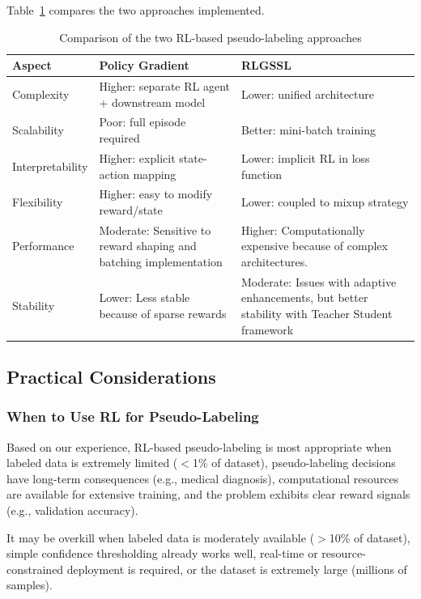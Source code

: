 \documentclass{scrartcl}
\begin{document}
Table~\ref{tab:approach_comparison} compares the two approaches implemented.

\begin{table}[H]
    \centering
    \begin{tabular}{p{3cm}p{5cm}p{5cm}}
        \hline
        \textbf{Aspect} & \textbf{Policy Gradient} & \textbf{RLGSSL} \\
        \hline
        Complexity & Higher: separate RL agent + downstream model & Lower: unified architecture \\
        Scalability & Poor: full episode required & Better: mini-batch training \\
        Interpretability & Higher: explicit state-action mapping & Lower: implicit RL in loss function \\
        Flexibility & Higher: easy to modify reward/state & Lower: coupled to mixup strategy \\
        Performance & Moderate: Sensitive to reward shaping and batching implementation & Higher: Computationally expensive because of complex architectures. \\
        Stability & Lower: Less stable because of sparse rewards & Moderate: Issues with adaptive enhancements, but better stability with Teacher Student framework \\
        \hline
    \end{tabular}
    \caption{Comparison of the two RL-based pseudo-labeling approaches}
    \label{tab:approach_comparison}
\end{table}

\subsection{Practical Considerations}

\subsubsection{When to Use RL for Pseudo-Labeling}

Based on our experience, RL-based pseudo-labeling is most appropriate when labeled data is extremely limited ($<$1\% of dataset), pseudo-labeling decisions have long-term consequences (e.g., medical diagnosis), computational resources are available for extensive training, and the problem exhibits clear reward signals (e.g., validation accuracy).

It may be overkill when labeled data is moderately available ($>$10\% of dataset), simple confidence thresholding already works well, real-time or resource-constrained deployment is required, or the dataset is extremely large (millions of samples).
\end{document}
